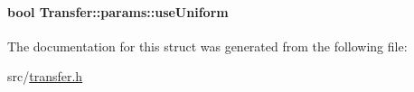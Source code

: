 \hypertarget{structTransfer_1_1params_ae7a3ce6f3514901c432d9d832cd3d298}{
\paragraph[{use\-Uniform}]{\setlength{\rightskip}{0pt plus 5cm}bool {\bf \-Transfer\-::params\-::use\-Uniform}}}\label{structTransfer_1_1params_ae7a3ce6f3514901c432d9d832cd3d298}


\-The documentation for this struct was generated from the following file\-:\begin{DoxyCompactItemize}
\item 
src/\hyperlink{transfer_8h}{transfer.\-h}\end{DoxyCompactItemize}

